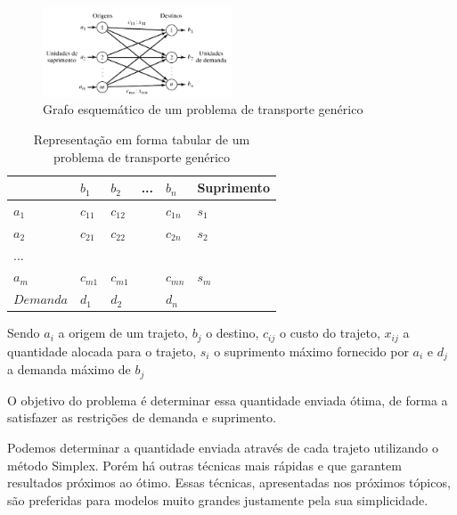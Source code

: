 \documentclass [11pt]{articleSBPO}
\begin{document}
\begin{figure}[!h]
	\centering
	\includegraphics[width=0.5\textwidth]{img/grafotransporte.png}
	\caption[]{Grafo esquemático de um problema de transporte genérico}
	\label{fig:grafotransporte}
\end{figure}

\begin{table}[]
	\centering
	\caption[]{Representação em forma tabular de um problema de transporte genérico}
	\label{fig:tabelatransporte}
	\begin{tabular}{ l | l  l  l  l | l }
				& $b_{1}$ 	& $b_{2}$ 	& ... & $b_{n}$  & Suprimento\\
				\hline
	$a_{1}$		& $c_{11}$ 	& $c_{12}$	&  	  & $c_{1n}$ & $s_{1}$\\
	$a_{2}$		& $c_{21}$ 	& $c_{22}$	&  	  & $c_{2n}$ & $s_{2}$\\
	...			&  &  &  &  & \\
	$a_{m}$		& $c_{m1}$ 	& $c_{m1}$	&  	  & $c_{mn}$ & $s_{m}$\\
				\hline
	$Demanda$	& $d_{1}$ 	& $d_{2}$ 	& 	  & $d_{n}$	 & \\
	\end{tabular}
\end{table}

Sendo $a_{i}$ a origem de um trajeto, $b_{j}$ o destino, $c_{ij}$ o custo do trajeto, $x_{ij}$ a quantidade alocada para o trajeto, $s_{i}$ o suprimento máximo fornecido por $a_{i}$ e $d_{j}$ a demanda máximo de $b_{j}$

O objetivo do problema é determinar essa quantidade enviada ótima, de forma a satisfazer as restrições de demanda e suprimento.

Podemos determinar a quantidade enviada através de cada trajeto utilizando o método Simplex. Porém há outras técnicas mais rápidas e que garantem resultados próximos ao ótimo. Essas técnicas, apresentadas nos próximos tópicos, são preferidas para modelos muito grandes justamente pela sua simplicidade.

%
%
\end{document}
